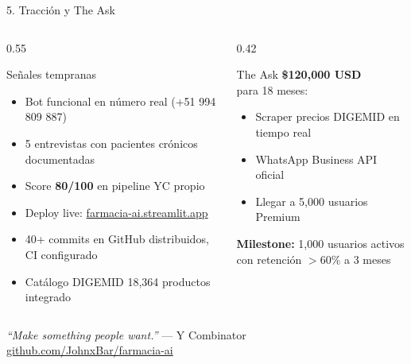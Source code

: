\documentclass[aspectratio=169,11pt]{beamer}
\newcommand{\cmark}{\textcolor{Green}{\ding{51}}}
\begin{document}
\begin{frame}{5. Tracci\'on y The Ask}
\begin{columns}[T]
\begin{column}{0.55\textwidth}
\begin{block}{Se\~nales tempranas}
\begin{itemize}
  \item[\cmark] Bot funcional en n\'umero real (+51 994 809 887)
  \item[\cmark] 5 entrevistas con pacientes cr\'onicos documentadas
  \item[\cmark] Score \textbf{80/100} en pipeline YC propio
  \item[\cmark] Deploy live: \url{farmacia-ai.streamlit.app}
  \item[\cmark] 40+ commits en GitHub distribuidos, CI configurado
  \item[\cmark] Cat\'alogo DIGEMID 18{,}364 productos integrado
\end{itemize}
\end{block}
\end{column}
\begin{column}{0.42\textwidth}
\begin{alertblock}{The Ask}
\centering
\Large\textbf{\$120,000 USD}\\[0.3em]
\normalsize para 18 meses:\\[0.3em]
\small
\begin{itemize}
  \item Scraper precios DIGEMID en tiempo real
  \item WhatsApp Business API oficial
  \item Llegar a 5{,}000 usuarios Premium
\end{itemize}
\bigskip
\textbf{Milestone:} 1{,}000 usuarios activos\\
con retenci\'on $>60\%$ a 3 meses
\end{alertblock}
\end{column}
\end{columns}

\bigskip\centering
\large\textit{``Make something people want.''} --- Y Combinator\\[0.3em]
\small\url{github.com/JohnxBar/farmacia-ai}
\end{frame}
\end{document}
